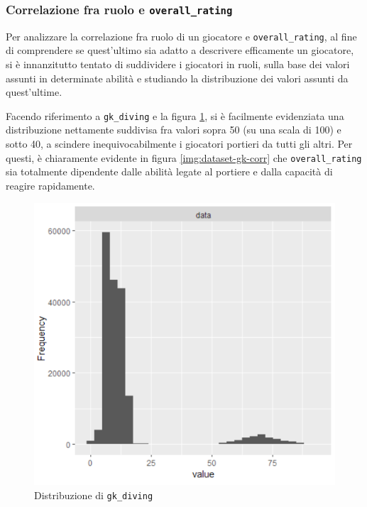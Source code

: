 \documentclass[hidelinks, 12pt]{article}
\begin{document}
\subsubsection{Correlazione fra ruolo e \texttt{overall\_rating}}

Per analizzare la correlazione fra ruolo di un giocatore e \texttt{overall\_rating}, al fine di comprendere se quest'ultimo sia adatto a descrivere efficamente un giocatore, si è innanzitutto tentato di suddividere i giocatori in ruoli, sulla base dei valori assunti in determinate abilità e studiando la distribuzione dei valori assunti da quest'ultime.

Facendo riferimento a \texttt{gk\_diving} e la figura \ref{img:dataset-gkdiving-distr}, si è facilmente evidenziata una distribuzione nettamente suddivisa fra valori sopra 50 (su una scala di 100) e sotto 40, a scindere inequivocabilmente i giocatori portieri da tutti gli altri. Per questi, è chiaramente evidente in figura \ref{img:dataset-gk-corr} che \texttt{overall\_rating} sia totalmente dipendente dalle abilità legate al portiere e dalla capacità di reagire rapidamente.

\begin{figure}[H]
	\centering
	\includegraphics[scale=0.65]{images/04_02_gkdiving_distribution.png}
	\caption[Distribuzione di \texttt{gk\_diving}]{Distribuzione di \texttt{gk\_diving}}
	\label{img:dataset-gkdiving-distr}
\end{figure}
\end{document}
